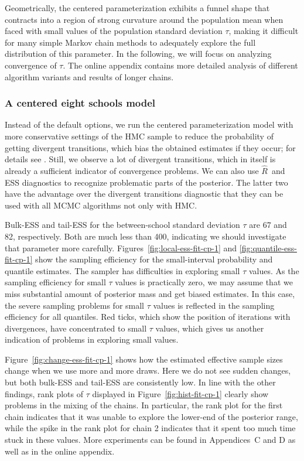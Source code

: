 \documentclass[american,]{article}
\newcommand{\Rhat}{$\widehat{R}$}
\theoremstyle{definition}
\begin{document}
Geometrically, the centered parameterization exhibits a funnel shape
that contracts into a region of strong curvature around the population
mean when faced with small
values of the population standard deviation $\tau$, making it difficult for many simple
Markov chain methods to adequately explore the full distribution of this
parameter. In the following, we will focus on analyzing convergence of $\tau$.
The online appendix contains more detailed analysis of different 
algorithm variants and results of longer chains.

\hypertarget{a-centered-eight-schools-model}{%
\subsubsection*{A centered eight schools
model}\label{a-centered-eight-schools-model}}

Instead of the default options, we run the centered parameterization
model with more conservative settings of the HMC sample to reduce the
probability of getting divergent transitions, which bias the obtained estimates 
if they occur;  for details see \cite{StanManual.2.18.0}.
Still, we observe a lot of divergent
transitions, which in itself is already a sufficient indicator of
convergence problems. We can also use \Rhat\ and ESS
diagnostics to recognize problematic parts of the posterior. The latter
two have the advantage over the divergent transitions diagnostic that they
can be used with all MCMC algorithms not only with HMC.

Bulk-ESS and tail-ESS for the between-school standard deviation $\tau$
are 67 and 82, respectively. Both are much less than 400, indicating we
should investigate that parameter more carefully.
Figures~\ref{fig:local-ess-fit-cp-1} and
\ref{fig:quantile-ess-fit-cp-1} show the sampling efficiency for the
small-interval probability and quantile estimates.
The sampler has difficulties in exploring small $\tau$ values. As the
sampling efficiency for small $\tau$ values is practically zero, we
may assume that we miss substantial amount of posterior mass and
get biased estimates. In this case, the severe sampling problems for
small $\tau$ values is reflected in the sampling efficiency for all
quantiles. Red ticks, which show the position of iterations with divergences,
have concentrated to small $\tau$ values, which gives us another indication
of problems in exploring small values.

Figure~\ref{fig:change-ess-fit-cp-1} shows how the estimated effective
sample sizes change when we use more and more draws. Here we do not
see sudden changes, but both bulk-ESS and tail-ESS are consistently low. 
In line with the other findings, rank plots of $\tau$ displayed in
Figure~\ref{fig:hist-fit-cp-1} clearly show problems in the mixing of
the chains.  In particular, the rank plot for the first chain indicates that it was unable to 
explore the lower-end of the posterior range, while the spike in the rank plot 
for chain 2 indicates that it spent too much time stuck in these values.
More experiments can be found in Appendices~C and D as well as in the online appendix.
\end{document}
